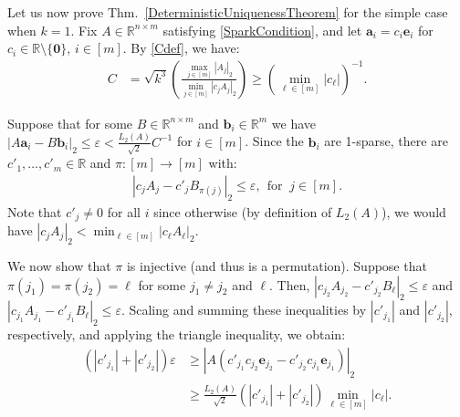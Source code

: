 \documentclass[journal, twocolumn]{IEEEtran}
\begin{document}
Let us now prove Thm.~\ref{DeterministicUniquenessTheorem} for the simple case when $k=1$. Fix $A \in \mathbb{R}^{n \times m}$ satisfying \eqref{SparkCondition}, and let $\mathbf{a}_i = c_i \mathbf{e}_i$ for $c_i \in \mathbb{R} \setminus \{\mathbf{0}\}$, $i \in [m]$. By \eqref{Cdef}, we have:
\begin{align}\label{C1}
C 
&= \sqrt{k^3} \left( \frac{\max_{j \in [m]} |A_j|_2}{\min_{j \in [m]}|c_jA_j|_2} \right)
\geq \left( \min_{\ell \in [m]} |c_{\ell}| \right)^{-1}.
\end{align}

Suppose that for some $B \in \mathbb{R}^{n \times m}$ and $\mathbf{b}_i \in \mathbb{R}^m$ we have  $|A\mathbf{a}_i - B\mathbf{b}_i|_2 \leq \varepsilon < \frac{L_2(A)}{\sqrt{2}}C^{-1}$ for $i \in [m]$. Since the $\mathbf{b}_i$ are 1-sparse, there are $c'_1, \ldots, c'_m \in \mathbb{R}$ and $\pi: [m] \to [m]$ with:
\begin{align}\label{1D}
|c_jA_j - c'_jB_{\pi(j)}|_2 \leq \varepsilon, \ \ \text{for } \  j \in [m].
\end{align} 
Note that $c'_j \neq 0$ for all $i$ since otherwise (by definition of $L_2(A)$), we would have $|c_jA_j|_2 < \min_{\ell \in [m]}|c_{\ell}A_{\ell}|_2$. 

We  now show that $\pi$ is injective (and thus is a permutation).
Suppose that $\pi(j_1) = \pi(j_2) = \ell$ for some $j_1 \neq j_2$ and $\ell$. Then, $|c_{j_2}A_{j_2} - c'_{j_2}B_{\ell}|_2 \leq \varepsilon$ and $|c_{j_1}A_{j_1} - c'_{j_1} B_{\ell}|_2  \leq \varepsilon$. Scaling and summing these inequalities by $|c'_{j_1}|$ and $|c'_{j_2}|$, respectively, and applying the triangle inequality, we obtain:
\begin{align}\label{contra}
(|c'_{j_1}| + |c'_{j_2}|) \varepsilon
&\geq |A(c'_{j_1}c_{j_2} \mathbf{e}_{j_2} - c'_{j_2}c_{j_1}\mathbf{e}_{j_1})|_2 \nonumber \\ 
&\geq \frac{L_2(A)}{\sqrt{2}} \left( |c'_{j_1}| + |c'_{j_2}| \right) \min_{\ell \in [m]} |c_\ell |.
\end{align}
%
\end{document}
